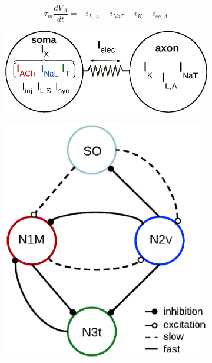 \begin{equation}
    \tau_m\frac{dV_A}{dt} = -i_{L,A} - i_{NaT} - i_K - i_{ec,A}
    \label{eq:axon}
\end{equation}

\begin{figure}
\centering
\begin{subfigure}[t]{0.5\textwidth}
\includegraphics[width=\textwidth]{img/methods-paper-modelo/figure1a.eps} 

\caption{} \label{fig:2 compartments}
\end{subfigure}
\hfill
\begin{subfigure}[t]{0.49\textwidth}
\centering
\includegraphics[width=\textwidth]{img/methods-paper-modelo/figure1b.eps} 
\caption{} \label{fig:CPG diagram}
\end{subfigure}
 

\end{figure}
